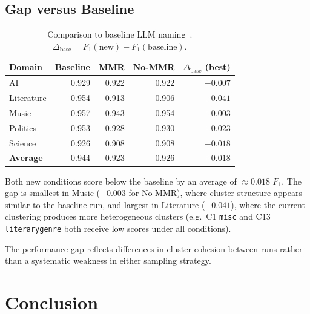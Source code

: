 \documentclass[11pt,a4paper]{article}
\begin{document}
\subsection{Gap versus Baseline}

\begin{table}[h]
\centering
\caption{Comparison to baseline LLM naming~\cite{cluster_naming_baseline}.
$\Delta_\text{base} = F_1(\text{new}) - F_1(\text{baseline})$.}
\label{tab:baseline}
\small
\begin{tabular}{lrrrr}
\toprule
\textbf{Domain} & \textbf{Baseline} & \textbf{MMR} & \textbf{No-MMR} & \textbf{$\Delta_\text{base}$ (best)} \\
\midrule
AI         & 0.929 & 0.922 & 0.922 & $-0.007$ \\
Literature & 0.954 & 0.913 & 0.906 & $-0.041$ \\
Music      & 0.957 & 0.943 & 0.954 & $-0.003$ \\
Politics   & 0.953 & 0.928 & 0.930 & $-0.023$ \\
Science    & 0.926 & 0.908 & 0.908 & $-0.018$ \\
\midrule
\textbf{Average} & 0.944 & 0.923 & 0.926 & $-0.018$ \\
\bottomrule
\end{tabular}
\end{table}

Both new conditions score below the baseline by an average of $\approx 0.018$ $F_1$.
The gap is smallest in Music ($-0.003$ for No-MMR), where cluster structure appears similar to the baseline run, and largest in Literature ($-0.041$), where the current clustering produces more heterogeneous clusters (e.g.\ C1 \texttt{misc} and C13 \texttt{literarygenre} both receive low scores under all conditions).

The performance gap reflects differences in cluster cohesion between runs rather than a systematic weakness in either sampling strategy.

\section{Conclusion}
\end{document}
